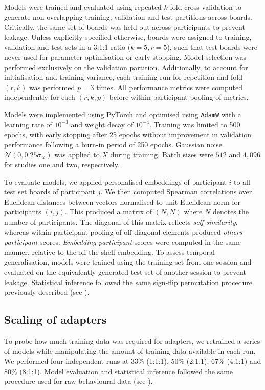 \documentclass[pdflatex,sn-mathphys]{sn-jnl}
\begin{document}
Models were trained and evaluated using repeated $k$-fold cross-validation to generate non-overlapping training, validation and test partitions across boards. Critically, the same set of boards was held out across participants to prevent leakage. Unless explicitly specified otherwise, boards were assigned to training, validation and test sets in a 3:1:1 ratio ($k = 5, r = 5$), such that test boards were never used for parameter optimisation or early stopping. Model selection was performed exclusively on the validation partition. Additionally, to account for initialisation and training variance, each training run for repetition and fold $(r, k)$ was performed $p = 3$ times. All performance metrics were computed independently for each $(r, k, p)$ before within-participant pooling of metrics.

Models were implemented using PyTorch\cite{torch} and optimised using \texttt{AdamW} with a learning rate of $10^{-3}$ and weight decay of $10^{-4}$. Training was limited to 500 epochs, with early stopping after 25 epochs without improvement in validation performance following a burn-in period of 250 epochs. Gaussian noise $\mathcal{N}(0, 0.25\sigma_X)$ was applied to $X$ during training. Batch sizes were $512$ and $4,096$ for studies one and two, respectively. 

To evaluate models, we applied personalised embeddings of participant $i$ to all test set boards of participant $j$. We then computed Spearman correlations over Euclidean distances between vectors normalised to unit Euclidean norm for participants $(i, j)$. This produced a matrix of $(N, N)$ where $N$ denotes the number of participants. The diagonal of this matrix reflects \textit{self-similarity}, whereas within-participant pooling of off-diagonal elements produced \textit{others-participant} scores. \textit{Embedding-participant} scores were computed in the same manner, relative to the off-the-shelf embedding. To assess temporal generalisation, models were trained using the training set from one session and evaluated on the equivalently generated test set of another session to prevent leakage. Statistical inference followed the same sign-flip permutation procedure previously described (see ).

\subsection{Scaling of adapters}\label{scaling}
To probe how much training data was required for adapters, we retrained a series of models while manipulating the amount of training data available in each run. We performed four independent runs at 33\% (1:1:1), 50\% (2:1:1), 67\% (4:1:1) and 80\% (8:1:1). Model evaluation and statistical inference followed the same procedure used for raw behavioural data (see ).
\end{document}
